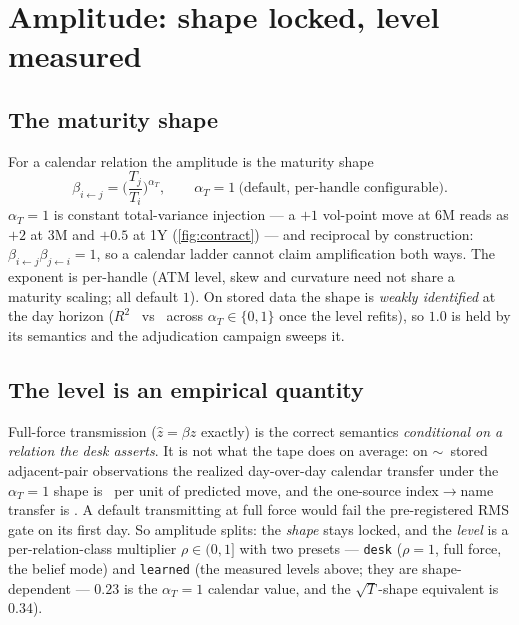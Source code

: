 \documentclass[11pt]{article}
\begin{document}
\section{Amplitude: shape locked, level measured}
\label{sec:amplitude}

\subsection{The maturity shape}

For a calendar relation the amplitude is the maturity shape
\begin{equation}
\beta_{i\leftarrow j}=\Big(\frac{T_j}{T_i}\Big)^{\alpha_T},
\qquad \alpha_T=1\ \text{(default, per-handle configurable)}.
\label{eq:beta}
\end{equation}
$\alpha_T=1$ is constant total-variance injection --- a $+1$ vol-point
move at 6M reads as $+2$ at 3M and $+0.5$ at 1Y
(\cref{fig:contract}) --- and reciprocal by construction:
$\beta_{i\leftarrow j}\beta_{j\leftarrow i}=1$, so a calendar ladder
cannot claim amplification both ways.  The exponent is per-handle (ATM
level, skew and curvature need not share a maturity scaling; all
default $1$).  On stored data the shape is \emph{weakly identified} at
the day horizon ($R^2$ \gmshaperzero\ vs \gmshaperone\ across
$\alpha_T\in\{0,1\}$ once the level refits), so $1.0$ is held by its
semantics and the adjudication campaign sweeps it.

\subsection{The level is an empirical quantity}

Full-force transmission ($\widehat z=\beta z$ exactly) is the correct
semantics \emph{conditional on a relation the desk asserts}.  It is not
what the tape does on average: on $\sim$\gmcalpairs\ stored
adjacent-pair observations the realized day-over-day calendar transfer
under the $\alpha_T=1$ shape is \gmcallevel\ per unit of predicted
move, and the one-source index$\to$name transfer is \gmrhoindex.  A
default transmitting at full force would fail the pre-registered RMS
gate on its first day.  So amplitude splits: the \emph{shape} stays
locked, and the \emph{level} is a per-relation-class multiplier
$\rho\in(0,1]$ with two presets --- \texttt{desk} ($\rho=1$, full
force, the belief mode) and \texttt{learned} (the measured levels
above; they are shape-dependent --- $0.23$ is the $\alpha_T=1$
calendar value, and the $\sqrt T$-shape equivalent is $0.34$).
\end{document}
